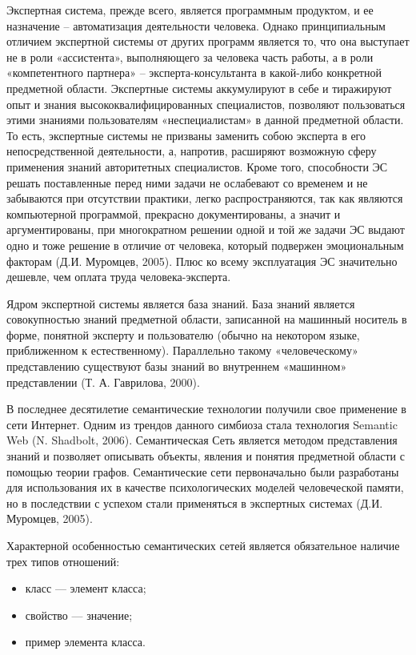 Экспертная система, прежде всего, является программным продуктом, и ее назначение – автоматизация деятельности человека. Однако принципиальным отличием экспертной системы  от других программ является то, что она выступает не в роли «ассистента», выполняющего за человека часть работы, а в роли «компетентного партнера» – эксперта-консультанта в какой-либо конкретной предметной области. Экспертные системы аккумулируют в себе и тиражируют опыт и знания высококвалифицированных специалистов, позволяют пользоваться этими знаниями пользователям «неспециалистам» в данной предметной области. То есть, экспертные системы не призваны заменить собою эксперта в его непосредственной деятельности, а, напротив, расширяют возможную сферу применения знаний авторитетных специалистов. Кроме того, способности ЭС решать поставленные перед ними задачи не ослабевают со временем и не забываются при отсутствии практики, легко распространяются, так как являются компьютерной программой, прекрасно документированы, а значит и аргументированы, при многократном решении одной и той же задачи ЭС выдают одно и тоже решение в отличие от человека, который подвержен эмоциональным факторам (Д.И.  Муромцев, 2005). Плюс ко всему эксплуатация ЭС значительно дешевле, чем оплата труда человека-эксперта. 

Ядром экспертной системы является база знаний. База знаний является совокупностью  знаний предметной области, записанной на машинный носитель в форме, понятной эксперту и пользователю (обычно на некотором языке, приближенном к естественному). Параллельно такому «человеческому» представлению существуют базы знаний во внутреннем «машинном» представлении (Т. А. Гаврилова, 2000).

В последнее десятилетие семантические технологии получили свое применение в сети Интернет. Одним из трендов данного симбиоза стала технология Semantic Web (N. Shadbolt, 2006). Семантическая Сеть является  методом представления знаний и позволяет описывать объекты, явления и понятия предметной области с помощью теории графов. Семантические сети первоначально были разработаны для использования их в качестве психологических моделей человеческой памяти, но в последствии с успехом стали применяться в экспертных системах (Д.И. Муромцев, 2005). 

Характерной особенностью семантических сетей является обязательное наличие трех типов отношений:

\begin{itemize}
\item класс — элемент класса;
\item свойство — значение; 
\item пример элемента класса.
\end{itemize}

